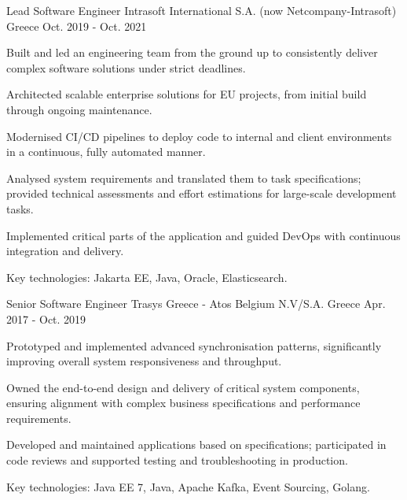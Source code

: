 \begin{cventries}
  \cventry
    {Lead Software Engineer} %
    {Intrasoft International S.A. (now Netcompany-Intrasoft)} %
    {Greece} %
    {Oct. 2019 - Oct. 2021} %
    {
      \begin{cvitems} %
        \item {Built and led an engineering team from the ground up to consistently deliver complex software solutions under strict deadlines.}
        \item {Architected scalable enterprise solutions for EU projects, from initial build through ongoing maintenance.}
        \item {Modernised CI/CD pipelines to deploy code to internal and client environments in a continuous, fully automated manner.}
        \item {Analysed system requirements and translated them to task specifications; provided technical assessments and effort estimations for \mbox{large-scale} development tasks.}
        \item {Implemented critical parts of the application and guided DevOps with continuous integration and delivery.}
        \item {Key technologies: Jakarta EE, Java, Oracle, Elasticsearch.}
      \end{cvitems}
    }

  \cventry
    {Senior Software Engineer} %
    {Trasys Greece - Atos Belgium N.V/S.A.} %
    {Greece} %
    {Apr. 2017 - Oct. 2019} %
    {
      \begin{cvitems} %
        \item {Prototyped and implemented advanced synchronisation patterns, significantly improving overall system responsiveness and throughput.}
        \item {Owned the end-to-end design and delivery of critical system components, ensuring alignment with complex business specifications and performance requirements.}
        \item {Developed and maintained applications based on specifications; participated in code reviews and supported testing and troubleshooting in production.}
        \item {Key technologies: Java EE 7, Java, Apache Kafka, Event Sourcing, Golang.}
      \end{cvitems}
    }


\end{cventries}
